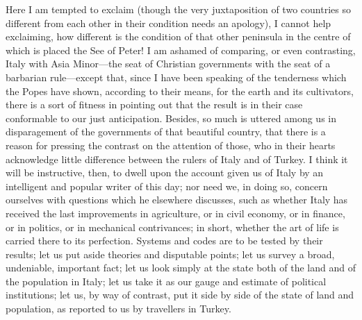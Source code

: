 Here I am tempted to exclaim
(though the very juxtaposition of two countries so different from
each other in their condition needs an apology), I cannot help
exclaiming, how different is the condition of that other peninsula in
the centre of which is placed the See of Peter! I am ashamed of
comparing, or even contrasting, Italy with Asia Minor—the seat of
Christian governments with the seat of a barbarian rule—except that,
since I have been speaking of the tenderness which the Popes have
shown, according to their means, for the earth and its cultivators,
there is a sort of fitness in pointing out that the result is in their
case conformable to our just anticipation. Besides, so much is uttered
among us in disparagement of the governments of that beautiful
country, that there is a reason for pressing the contrast on the
attention of those, who in their hearts acknowledge little difference
between the rulers of Italy and of Turkey. I think it will be
instructive, then, to dwell upon the account given us of Italy by an
intelligent and popular writer of this day; nor need we, in doing so,
concern ourselves with questions which he elsewhere discusses, such as
whether Italy has received the last improvements in agriculture, or in
civil economy, or in finance, or in politics, or in mechanical
contrivances; in short, whether the art of life is carried there to
its perfection. Systems and codes are to be tested by their results; let us put aside theories and disputable points; let us
survey a broad, undeniable, important fact; let us look simply at the
state both of the land and of the population in Italy; let us take it
as our gauge and estimate of political institutions; let us, by way of
contrast, put it side by side of the state of land and population, as
reported to us by travellers in Turkey.

